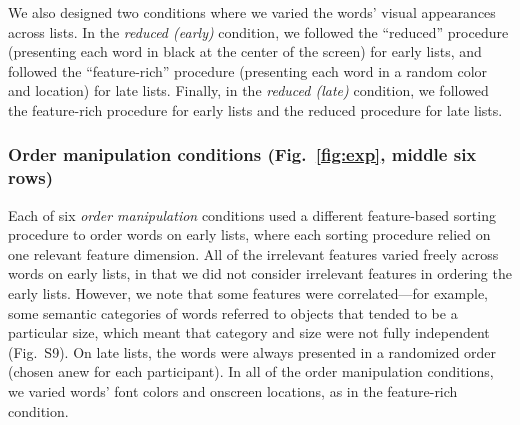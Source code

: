 \documentclass[11pt]{article}
\newcommand{\featureCorrs}{S9}
\begin{document}
We also designed two conditions where we varied the words' visual appearances
across lists. In the \textit{reduced (early)} condition, we followed the
``reduced'' procedure (presenting each word in black at the center of the
screen) for early lists, and followed the ``feature-rich'' procedure
(presenting each word in a random color and location) for late lists. Finally,
in the \textit{reduced (late)} condition, we followed the feature-rich
procedure for early lists and the reduced procedure for late lists.

\subsubsection*{Order manipulation conditions (Fig.~\ref{fig:exp}, middle six
rows)}

Each of six \textit{order manipulation} conditions used a different
feature-based sorting procedure to order words on early lists, where each
sorting procedure relied on one relevant feature dimension. All of the
irrelevant features varied freely across words on early lists, in that we did
not consider irrelevant features in ordering the early lists. However, we note
that some features were correlated---for example, some semantic categories of
words referred to objects that tended to be a particular size, which meant that
category and size were not fully independent (Fig.~\featureCorrs). On late
lists, the words were always presented in a randomized order (chosen anew for
each participant). In all of the order manipulation conditions, we varied
words' font colors and onscreen locations, as in the feature-rich condition.
\end{document}

